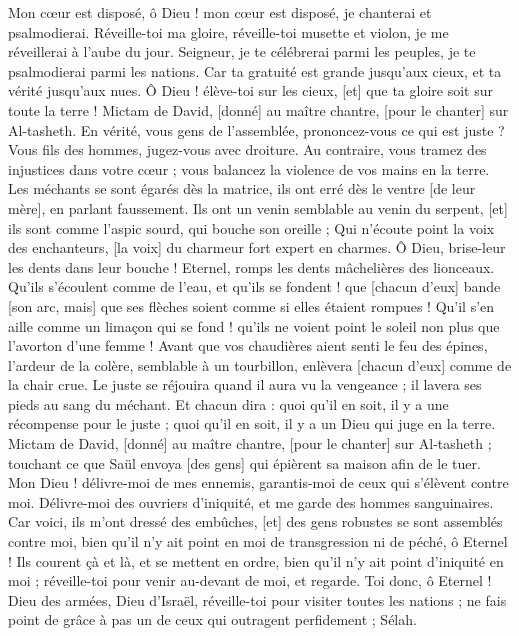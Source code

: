 \begin{multicols}{2}
Mon cœur est disposé, ô Dieu ! mon cœur est disposé, je chanterai et psalmodierai.
Réveille-toi ma gloire, réveille-toi musette et violon, je me réveillerai à l'aube du jour.
Seigneur, je te célébrerai parmi les peuples, je te psalmodierai parmi les nations.
Car ta gratuité est grande jusqu'aux cieux, et ta vérité jusqu'aux nues.
Ô Dieu ! élève-toi sur les cieux, [et] que ta gloire soit sur toute la terre !
\VerseOne{}Mictam de David, [donné] au maître chantre, [pour le chanter] sur Al-tasheth. En vérité, vous gens de l'assemblée, prononcez-vous ce qui est juste ? Vous fils des hommes, jugez-vous avec droiture.
Au contraire, vous tramez des injustices dans votre cœur ; vous balancez la violence de vos mains en la terre.
Les méchants se sont égarés dès la matrice, ils ont erré dès le ventre [de leur mère], en parlant faussement.
Ils ont un venin semblable au venin du serpent, [et] ils sont comme l'aspic sourd, qui bouche son oreille ;
Qui n'écoute point la voix des enchanteurs, [la voix] du charmeur fort expert en charmes.
Ô Dieu, brise-leur les dents dans leur bouche ! Eternel, romps les dents mâchelières des lionceaux.
Qu'ils s'écoulent comme de l'eau, et qu'ils se fondent ! que [chacun d'eux] bande [son arc, mais] que ses flèches soient comme si elles étaient rompues !
Qu'il s'en aille comme un limaçon qui se fond ! qu'ils ne voient point le soleil non plus que l'avorton d'une femme !
Avant que vos chaudières aient senti le feu des épines, l'ardeur de la colère, semblable à un tourbillon, enlèvera [chacun d'eux] comme de la chair crue.
Le juste se réjouira quand il aura vu la vengeance ; il lavera ses pieds au sang du méchant.
Et chacun dira : quoi qu'il en soit, il y a une récompense pour le juste ; quoi qu'il en soit, il y a un Dieu qui juge en la terre.
\VerseOne{}Mictam de David, [donné] au maître chantre, [pour le chanter] sur Al-tasheth ; touchant ce que Saül envoya [des gens] qui épièrent sa maison afin de le tuer. Mon Dieu ! délivre-moi de mes ennemis, garantis-moi de ceux qui s'élèvent contre moi.
Délivre-moi des ouvriers d'iniquité, et me garde des hommes sanguinaires.
Car voici, ils m'ont dressé des embûches, [et] des gens robustes se sont assemblés contre moi, bien qu'il n'y ait point en moi de transgression ni de péché, ô Eternel !
Ils courent çà et là, et se mettent en ordre, bien qu'il n'y ait point d'iniquité en moi ; réveille-toi pour venir au-devant de moi, et regarde.
Toi donc, ô Eternel ! Dieu des armées, Dieu d'Israël, réveille-toi pour visiter toutes les nations ; ne fais point de grâce à pas un de ceux qui outragent perfidement ; Sélah.

\end{multicols}
